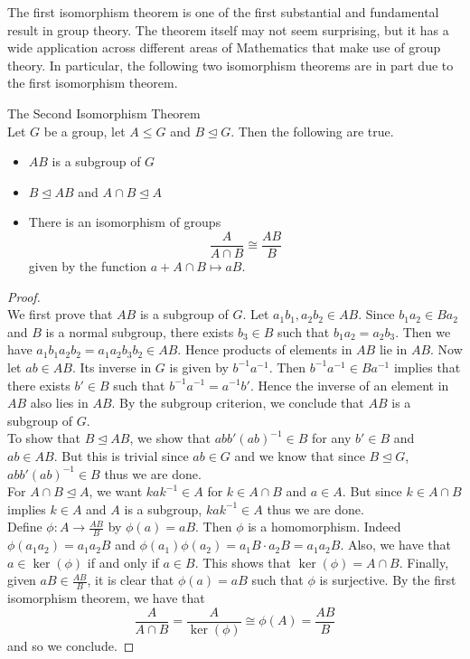 \documentclass[a4paper]{article}
\begin{document}
The first isomorphism theorem is one of the first substantial and fundamental result in group theory. The theorem itself may not seem surprising, but it has a wide application across different areas of Mathematics that make use of group theory. In particular, the following two isomorphism theorems are in part due to the first isomorphism theorem. 

\begin{thm}{The Second Isomorphism Theorem}{}\\
Let $G$ be a group, let $A\leq G$ and $B\trianglelefteq G$. Then the following are true. 
\begin{itemize}
\item $AB$ is a subgroup of $G$
\item $B\trianglelefteq AB$ and $A\cap B\trianglelefteq A$
\item There is an isomorphism of groups $$\frac{A}{A\cap B}\cong\frac{AB}{B}$$ given by the function $a+A\cap B\mapsto aB$. 
\end{itemize} 
\begin{proof}\\
We first prove that $AB$ is a subgroup of $G$. Let $a_1b_1,a_2b_2\in AB$. Since $b_1a_2\in Ba_2$ and $B$ is a normal subgroup, there exists $b_3\in B$ such that $b_1a_2=a_2b_3$. Then we have $a_1b_1a_2b_2=a_1a_2b_3b_2\in AB$. Hence products of elements in $AB$ lie in $AB$. Now let $ab\in AB$. Its inverse in $G$ is given by $b^{-1}a^{-1}$. Then $b^{-1}a^{-1}\in Ba^{-1}$ implies that there exists $b'\in B$ such that $b^{-1}a^{-1}=a^{-1}b'$. Hence the inverse of an element in $AB$ also lies in $AB$. By the subgroup criterion, we conclude that $AB$ is a subgroup of $G$. \\

To show that $B\trianglelefteq AB$, we show that $abb'(ab)^{-1}\in B$ for any $b'\in B$ and $ab\in AB$. But this is trivial since $ab\in G$ and we know that since $B\trianglelefteq G$, $abb'(ab)^{-1}\in B$ thus we are done. \\
For $A\cap B\trianglelefteq A$, we want $kak^{-1}\in A$ for $k\in A\cap B$ and $a\in A$. But since $k\in A\cap B$ implies $k\in A$ and $A$ is a subgroup, $kak^{-1}\in A$ thus we are done. \\

Define $\phi:A\to\frac{AB}{B}$ by $\phi(a)=aB$. Then $\phi$ is a homomorphism. Indeed $\phi(a_1a_2)=a_1a_2B$ and $\phi(a_1)\phi(a_2)=a_1B\cdot a_2B=a_1a_2B$. Also, we have that $a\in\ker(\phi)$ if and only if $a\in B$. This shows that $\ker(\phi)=A\cap B$. Finally, given $aB\in\frac{AB}{B}$, it is clear that $\phi(a)=aB$ such that $\phi$ is surjective. By the first isomorphism theorem, we have that $$\frac{A}{A\cap B}=\frac{A}{\ker(\phi)}\cong\phi(A)=\frac{AB}{B}$$ and so we conclude. 
\end{proof}
\end{thm}
\end{document}
